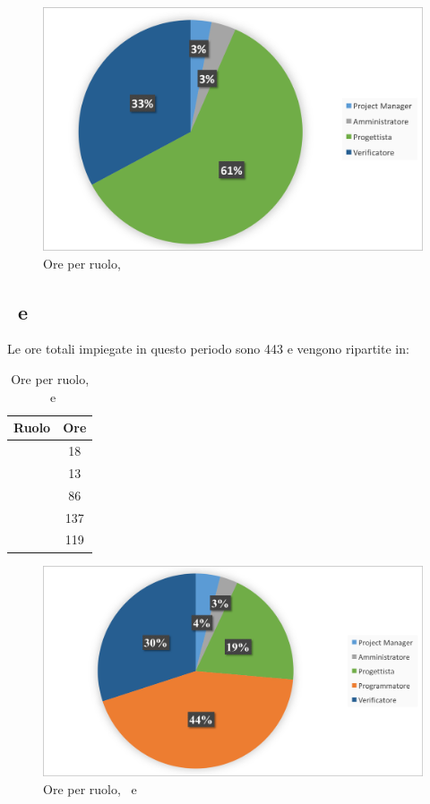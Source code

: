 \begin{figure}[H]
	\centering 
	\includegraphics[scale=0.7]{Immagini/GraficiTorte/PA.png}
	\caption{Ore per ruolo, \PA}
\end{figure}

\newpage
\subsection{\PD\ e \COD}
Le ore totali impiegate in questo periodo sono 443 e vengono ripartite in:

\begin{table}[h]
	\begin{center}
		\begin{tabular}{|c|c|}
			\hline
			\textbf{Ruolo}	& \textbf{Ore} \\
			\hline
			\Pm &	18\\
			\hline
			\Am	&	13\\
			\hline
			\Prog	&	86\\
			\hline
			\Progr	&	137\\
			\hline
			\Ver	&	119\\
			\hline
		\end{tabular}
	\end{center}
	\caption{Ore per ruolo, \PD\ e \COD}
\end{table}

\begin{figure}[H]
	\centering 
	\includegraphics[scale=0.7]{Immagini/GraficiTorte/PDCOD.png}
	\caption{Ore per ruolo, \PD\ e \COD}
\end{figure}

